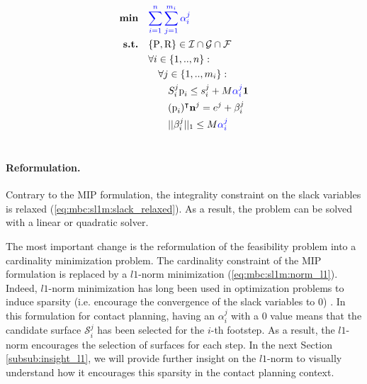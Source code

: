 \begin{align}
    \textrm{\textbf{min}}  \quad & \textcolor{blue}{\sum_{i=1}^{n} \sum_{j=1}^{m_i} \alpha_i^j} \label{eq:mbc:sl1m:norm_l1}\\
    \textrm{\textbf{s.t.}}  \quad & \{\mbox{P},\mbox{R}\} \in \mathcal{I} \cap \mathcal{G} \cap \mathcal{F} \nonumber\\
                            \quad & \forall i \in \{1,..,n\} : \nonumber\\
                                \quad & \quad \forall j \in \{1,..,m_i\} : \nonumber\\
                                    \quad & \quad \quad S_i^j\mbox{p}_i \leq s_i^j + M \textcolor{blue}{\alpha_i^j} \textbf{1} \nonumber\\
                                    \quad & \quad \quad (\mbox{p}_i)^{\intercal} \textbf{n}^j = e^j + \beta_i^j \nonumber\\
                                    \quad & \quad \quad ||\beta_i^j||_1 \leq M \textcolor{blue}{\alpha_i^j} \nonumber\\
                                    \nonumber
\end{align}
\paragraph{Reformulation.}
Contrary to the MIP formulation, the integrality constraint on the slack variables is relaxed (\ref{eq:mbc:sl1m:slack_relaxed}). 
As a result, the problem can be solved with a linear or quadratic solver.

The most important change is the reformulation of the feasibility problem into a cardinality minimization problem. The cardinality constraint of the MIP formulation is replaced by a $l1$-norm minimization (\ref{eq:mbc:sl1m:norm_l1}).
Indeed, $l1$-norm minimization has long been used in optimization problems to induce sparsity (i.e. encourage the convergence of the slack variables to 0) \cite{boyd2004convex}. 
In this formulation for contact planning, having an $\alpha_i^j$ with a 0 value means that the candidate surface $\mathcal{S}_i^j$ has been selected for the $i$-th footstep. 
As a result, the $l1$-norm encourages the selection of surfaces for each step.
In the next Section \ref{subsub:insight_l1}, we will provide further insight on the $l1$-norm to visually understand how it encourages this sparsity in the contact planning context.

